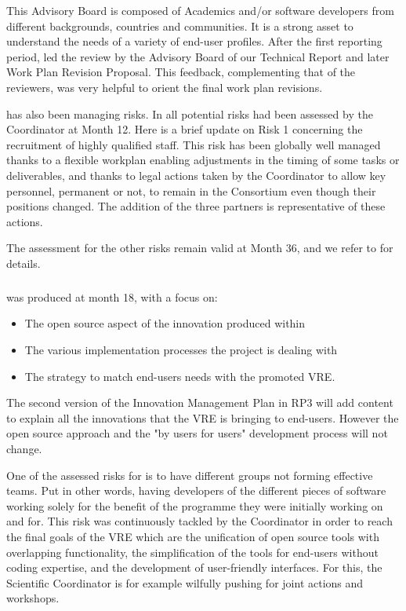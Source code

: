 This Advisory Board is composed of Academics and/or software
developers from different backgrounds, countries and communities. It
is a strong asset to understand the needs of a variety of end-user
profiles. After the first reporting period,  led the review
by the Advisory Board of our Technical Report and later Work Plan
Revision Proposal. This feedback, complementing that of the reviewers,
was very helpful to orient the final work plan revisions.

 has also been managing risks. In 
all potential risks had been assessed by the Coordinator at Month 12.
Here is a brief update on Risk 1 concerning the recruitment of highly
qualified staff. This risk has been globally well managed thanks to a
flexible workplan enabling adjustments in the timing of some tasks or
deliverables, and thanks to legal actions taken by the Coordinator to
allow key personnel, permanent or not, to remain in the Consortium
even though their positions changed. The addition of the three
partners is representative of these actions.

The assessment for the
other risks remain valid at Month 36, and we refer to
 for details.

\subparagraph{}

 was produced at month 18, with a focus on:

\begin{itemize}
\item{The open source aspect of the innovation produced within \ODK}
\item{The various implementation processes the project is dealing with}
\item{The strategy to match end-users needs with the promoted VRE}.
\end{itemize}

The second version of the Innovation Management Plan in RP3 will add content
to explain all the innovations that the VRE is bringing to end-users.
However the open source approach and the "by users for users"
development process will not change.

One of the assessed risks for
\ODK is to have different groups not forming effective teams. Put in
other words, having developers of the different pieces of software
working solely for the benefit of the programme they were initially
working on and for. This risk was continuously tackled by the
Coordinator in order to reach the final goals of the VRE which are the
unification of open source tools with overlapping functionality, the
simplification of the tools for end-users without coding expertise,
and the development of user-friendly interfaces. For this, the
Scientific Coordinator is for example wilfully pushing for joint
actions and workshops.


